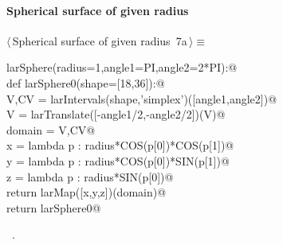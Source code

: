 \documentclass[11pt,oneside]{article}	%
\begin{document}
\paragraph{Spherical surface of given radius}
\begin{flushleft} \small \label{scrap11}
\protect{}$\langle\,$Spherical surface of given radius\nobreak\ {\footnotesize 7a}$\,\rangle\equiv$
\vspace{-1ex}
\begin{list}{}{} \item
\mbox{}\verb@def larSphere(radius=1,angle1=PI,angle2=2*PI):@\\
\mbox{}\verb@   def larSphere0(shape=[18,36]):@\\
\mbox{}\verb@      V,CV = larIntervals(shape,'simplex')([angle1,angle2])@\\
\mbox{}\verb@      V = larTranslate([-angle1/2,-angle2/2])(V)@\\
\mbox{}\verb@      domain = V,CV@\\
\mbox{}\verb@      x = lambda p : radius*COS(p[0])*COS(p[1])@\\
\mbox{}\verb@      y = lambda p : radius*COS(p[0])*SIN(p[1])@\\
\mbox{}\verb@      z = lambda p : radius*SIN(p[0])@\\
\mbox{}\verb@      return larMap([x,y,z])(domain)@\\
\mbox{}\verb@   return larSphere0@\\
\mbox{}\verb@@{\NWsep}
\end{list}
\vspace{-1ex}
\footnotesize\addtolength{\baselineskip}{-1ex}
\begin{list}{}{\setlength{\itemsep}{-\parsep}\setlength{\itemindent}{-\leftmargin}}
\item \NWtxtMacroRefIn\ .
\end{list}
\end{flushleft}
\end{document}
